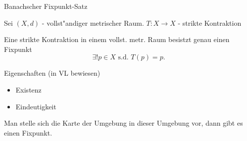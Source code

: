 \documentclass[class=article, crop=false]{standalone}
\begin{document}
\begin{zettel}{Banachscher Fixpunkt-Satz}
\begin{flashcard}
    Sei $ (X,d) $  - vollst"andiger metrischer Raum. $T: X \longrightarrow X$ - strikte Kontraktion 
    
    \begin{theorem}
        Eine strikte Kontraktion in einem vollst. metr. Raum besistzt genau einen Fixpunkt
        \[
            \exists ! p \in  X \text{ s.d. } T(p)  = p
        .\]
    \end{theorem}
\end{flashcard}
\begin{remark}
    Eigenschaften (in VL bewiesen)
    \begin{itemize}
        \item Existenz
        \item Eindeutigkeit
    \end{itemize}
\end{remark}
    \begin{example}[Fixpunkt]
        Man stelle sich die Karte der Umgebung in dieser Umgebung vor, dann gibt es einen Fixpunkt.
    \end{example}
\end{zettel}
\end{document}
